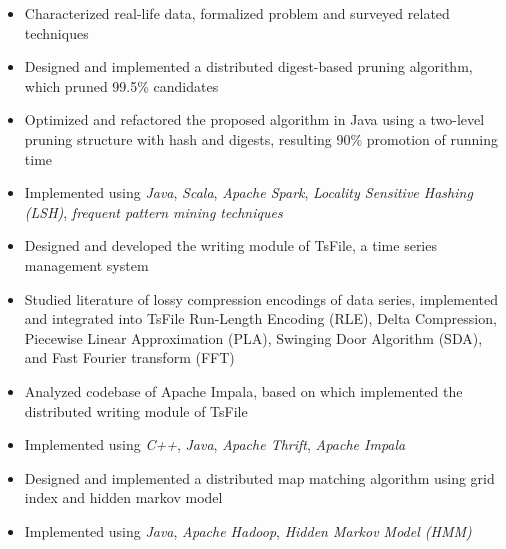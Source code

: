 \documentclass{resume}
\begin{document}
\begin{itemize}
  \item Characterized real-life data, formalized problem and surveyed related techniques
  \item Designed and implemented a distributed digest-based pruning algorithm, which pruned 99.5\% candidates 
  \item Optimized and refactored the proposed algorithm in Java using a two-level pruning structure with hash and digests, resulting 90\% promotion of running time
  \item Implemented using \emph{Java}, \emph{Scala}, \emph{Apache Spark}, \emph{Locality Sensitive Hashing (LSH)}, \emph{frequent pattern mining techniques}
\end{itemize}

\begin{itemize}
  \item Designed and developed the writing module of TsFile, a time series management system
  \item Studied literature of lossy compression encodings of data series, implemented and integrated into TsFile 
  Run-Length Encoding (RLE), Delta Compression, Piecewise Linear Approximation (PLA), Swinging Door Algorithm (SDA), and Fast Fourier transform (FFT)
  \item Analyzed codebase of Apache Impala, based on which implemented the distributed writing module of TsFile
  \item Implemented using \emph{C++}, \emph{Java}, \emph{Apache Thrift}, \emph{Apache Impala}
\end{itemize}

\begin{itemize}
  \item Designed and implemented a distributed map matching algorithm using grid index and hidden markov model
  \item Implemented using \emph{Java}, \emph{Apache Hadoop}, \emph{Hidden Markov Model (HMM)}
\end{itemize}
\end{document}
